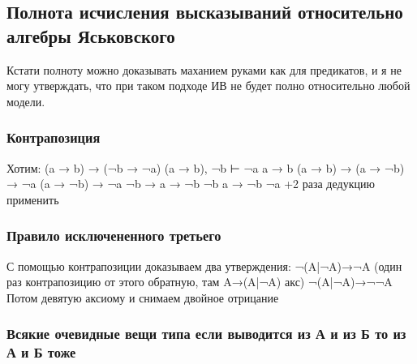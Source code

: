 \documentclass[11pt]{article}
\begin{document}
\subsection{Полнота исчисления высказываний относительно алгебры Яськовского}
\label{sec-4-1}
Кстати полноту можно доказывать маханием руками как для предикатов,
и я не могу утверждать, что при таком подходе ИВ не будет полно
относительно любой модели.
\subsubsection{Контрапозиция}
\label{sec-4-1-1}
Хотим: (a → b) → (¬b → ¬a)
(a → b), ¬b ⊢ ¬a
a → b
(a → b) → (a → ¬b) → ¬a
(a → ¬b) → ¬a
¬b → a → ¬b
¬b
a → ¬b
¬a
+2 раза дедукцию применить
\subsubsection{Правило исключененного третьего}
\label{sec-4-1-2}
С помощью контрапозиции доказываем два утверждения:
¬(A|¬A)→¬A (один раз контрапозицию от этого обратную, там A→(A|¬A) акс)
¬(A|¬A)→¬¬A
Потом девятую аксиому и снимаем двойное отрицание
\subsubsection{Всякие очевидные вещи типа если выводится из А и из Б то из А и Б тоже}
\label{sec-4-1-3}
\end{document}
